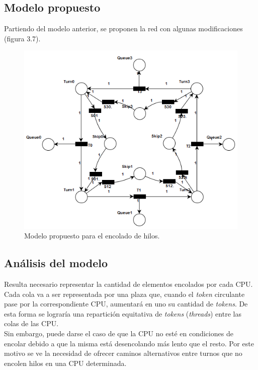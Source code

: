 \documentclass[a4paper]{book}
\begin{document}
\subsection{Modelo propuesto}
Partiendo del modelo anterior, se proponen la red con algunas modificaciones (figura 3.7).

\begin{figure} [H]
	\begin{center}
	    \includegraphics[scale=0.9]{./imagenes/it4modelored.png}
		\caption{Modelo propuesto para el encolado de hilos.}
	\end{center}
\end{figure}

\subsection{An\'alisis del modelo}
Resulta necesario representar la cantidad de elementos encolados por cada CPU. Cada cola va a ser representada por una plaza que, cuando el \emph{token} circulante pase por la correspondiente CPU, aumentar\'a en uno su cantidad de \emph{tokens}. De esta forma se lograr\'ia una repartici\'on equitativa de \emph{tokens} (\emph{threads}) entre las colas de las CPU.\\

Sin embargo, puede darse el caso de que la CPU no est\'e en condiciones de encolar debido a que la misma est\'a desencolando m\'as lento que el resto. Por este motivo se ve la necesidad de ofrecer caminos alternativos entre turnos que no encolen hilos en una CPU determinada.\\
\end{document}
